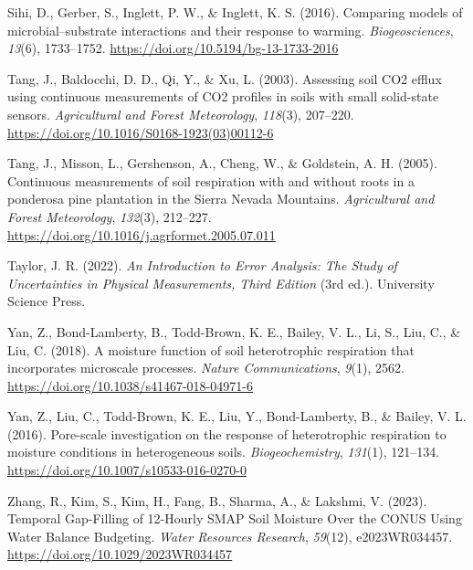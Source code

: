 \documentclass[
  letterpaper,
  DIV=11,
  numbers=noendperiod]{scrartcl}
\newlength{\cslhangindent}
\newenvironment{CSLReferences}[2] %
 {\begin{list}{}{%
  \setlength{\itemindent}{0pt}
  \setlength{\leftmargin}{0pt}
  \setlength{\parsep}{0pt}
  \ifodd #1
   \setlength{\leftmargin}{\cslhangindent}
   \setlength{\itemindent}{-1\cslhangindent}
  \fi
  \setlength{\itemsep}{#2\baselineskip}}}
 {\end{list}}
\begin{document}
\begin{CSLReferences}{1}{0}
Sihi, D., Gerber, S., Inglett, P. W., \& Inglett, K. S. (2016).
Comparing models of microbial--substrate interactions and their response
to warming. \emph{Biogeosciences}, \emph{13}(6), 1733--1752.
\url{https://doi.org/10.5194/bg-13-1733-2016}

Tang, J., Baldocchi, D. D., Qi, Y., \& Xu, L. (2003). Assessing soil
{CO2} efflux using continuous measurements of {CO2} profiles in soils
with small solid-state sensors. \emph{Agricultural and Forest
Meteorology}, \emph{118}(3), 207--220.
\url{https://doi.org/10.1016/S0168-1923(03)00112-6}

Tang, J., Misson, L., Gershenson, A., Cheng, W., \& Goldstein, A. H.
(2005). Continuous measurements of soil respiration with and without
roots in a ponderosa pine plantation in the {Sierra Nevada Mountains}.
\emph{Agricultural and Forest Meteorology}, \emph{132}(3), 212--227.
\url{https://doi.org/10.1016/j.agrformet.2005.07.011}

Taylor, J. R. (2022). \emph{An {Introduction} to {Error Analysis}: {The
Study} of {Uncertainties} in {Physical Measurements}, {Third Edition}}
(3rd ed.). University Science Press.

Yan, Z., Bond-Lamberty, B., Todd-Brown, K. E., Bailey, V. L., Li, S.,
Liu, C., \& Liu, C. (2018). A moisture function of soil heterotrophic
respiration that incorporates microscale processes. \emph{Nature
Communications}, \emph{9}(1), 2562.
\url{https://doi.org/10.1038/s41467-018-04971-6}

Yan, Z., Liu, C., Todd-Brown, K. E., Liu, Y., Bond-Lamberty, B., \&
Bailey, V. L. (2016). Pore-scale investigation on the response of
heterotrophic respiration to moisture conditions in heterogeneous soils.
\emph{Biogeochemistry}, \emph{131}(1), 121--134.
\url{https://doi.org/10.1007/s10533-016-0270-0}

Zhang, R., Kim, S., Kim, H., Fang, B., Sharma, A., \& Lakshmi, V.
(2023). Temporal {Gap-Filling} of 12-{Hourly SMAP Soil Moisture Over}
the {CONUS Using Water Balance Budgeting}. \emph{Water Resources
Research}, \emph{59}(12), e2023WR034457.
\url{https://doi.org/10.1029/2023WR034457}

\end{CSLReferences}
\end{document}
